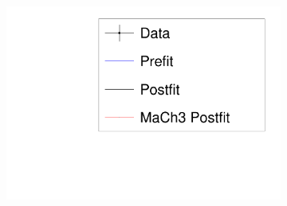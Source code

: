 \begin{figure}
	\begin{subfigure}[t]{0.20\textwidth}
		\includegraphics[width=\textwidth, trim={15mm 15mm 15mm 15mm}, clip, page=1]{figures/mach3/banff/mach3banff_mom}
	\end{subfigure}


\end{figure}
